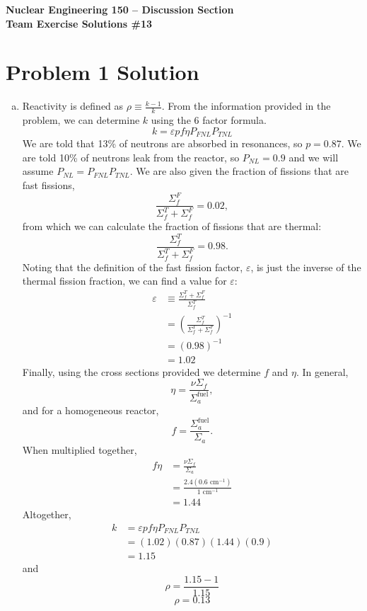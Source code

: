 \documentclass{report}
\begin{document}
\begin{center}
\textbf{\large Nuclear Engineering 150 -- Discussion Section}\\ 
\textbf{Team Exercise Solutions \#13}
\end{center}



\section*{Problem 1 Solution}


\begin{enumerate}[a)]

\item Reactivity is defined as $\rho \equiv \frac{k - 1}{k}$. From the information provided in the problem, we can determine $k$ using the 6 factor formula. 
$$ k = \varepsilon p f \eta P_{\textit{FNL}} P_{\textit{TNL}} $$
We are told that 13\% of neutrons are absorbed in resonances, so $p = 0.87$. We are told 10\% of neutrons leak from the reactor, so $P_{\textit{NL}} = 0.9$ and we will assume $P_{\textit{NL}} = P_{\textit{FNL}} P_{\textit{TNL}}$. We are also given the fraction of fissions that are fast fissions,
$$ \frac{\Sigma_f^F}{\Sigma_f^T + \Sigma_f^F} = 0.02 ,$$
from which we can calculate the fraction of fissions that are thermal:
$$ \frac{\Sigma_f^T}{\Sigma_f^T + \Sigma_f^F} = 0.98 .$$
Noting that the definition of the fast fission factor, $\varepsilon$, is just the inverse of the thermal fission fraction, we can find a value for $\varepsilon$:
\begin{align*}
\varepsilon	&\equiv \frac{\Sigma_f^T + \Sigma_f^F}{\Sigma_f^T} \\
			&= \left(\frac{\Sigma_f^T}{\Sigma_f^T + \Sigma_f^F}\right)^{-1} \\
			&= \left(0.98\right)^{-1} \\
			&= 1.02 
\end{align*}
Finally, using the cross sections provided we determine $f$ and $\eta$. In general,
$$ \eta = \frac{\nu\Sigma_f}{\Sigma_a^{\text{fuel}}} ,$$
and for a homogeneous reactor, 
$$ f = \frac{\Sigma_a^{\text{fuel}}}{\Sigma_a} .$$
When multiplied together,
\begin{align*}
f \eta	&= \frac{\nu\Sigma_f}{\Sigma_a} \\
		&= \frac{2.4\left(0.6\text{ cm}^{-1}\right)}{1\text{ cm}^{-1}} \\
		&= 1.44
\end{align*}
Altogether,
\begin{align*}
k	&= \varepsilon p f \eta P_{\textit{FNL}} P_{\textit{TNL}} \\
	&= \left(1.02\right)\left(0.87\right)\left(1.44\right)\left(0.9\right) \\
	&= 1.15
\end{align*}
and
$$ \rho = \frac{1.15-1}{1.15} $$
$$\boxed{ \rho = 0.13 }$$


\end{enumerate}
\end{document}
